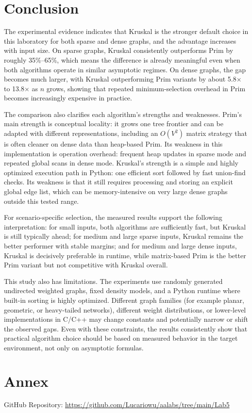 \documentclass{labreport}
\begin{document}
\section{Conclusion}

The experimental evidence indicates that Kruskal is the stronger default choice in this laboratory for both sparse and dense graphs, and the advantage increases with input size. On sparse graphs, Kruskal consistently outperforms Prim by roughly 35\%--65\%, which means the difference is already meaningful even when both algorithms operate in similar asymptotic regimes. On dense graphs, the gap becomes much larger, with Kruskal outperforming Prim variants by about 5.8$\times$ to 13.8$\times$ as $n$ grows, showing that repeated minimum-selection overhead in Prim becomes increasingly expensive in practice.

The comparison also clarifies each algorithm's strengths and weaknesses. Prim's main strength is conceptual locality: it grows one tree frontier and can be adapted with different representations, including an $O(V^2)$ matrix strategy that is often cleaner on dense data than heap-based Prim. Its weakness in this implementation is operation overhead: frequent heap updates in sparse mode and repeated global scans in dense mode. Kruskal's strength is a simple and highly optimized execution path in Python: one efficient sort followed by fast union-find checks. Its weakness is that it still requires processing and storing an explicit global edge list, which can be memory-intensive on very large dense graphs outside this tested range.

For scenario-specific selection, the measured results support the following interpretation: for small inputs, both algorithms are sufficiently fast, but Kruskal is still typically ahead; for medium and large sparse inputs, Kruskal remains the better performer with stable margins; and for medium and large dense inputs, Kruskal is decisively preferable in runtime, while matrix-based Prim is the better Prim variant but not competitive with Kruskal overall.

This study also has limitations. The experiments use randomly generated undirected weighted graphs, fixed density models, and a Python runtime where built-in sorting is highly optimized. Different graph families (for example planar, geometric, or heavy-tailed networks), different weight distributions, or lower-level implementations in C/C++ may change constants and potentially narrow or shift the observed gaps. Even with these constraints, the results consistently show that practical algorithm choice should be based on measured behavior in the target environment, not only on asymptotic formulas.

\newpage

\section{Annex}

GitHub Repository: \url{https://github.com/Lucariowu/aalabs/tree/main/Lab5}
\end{document}
